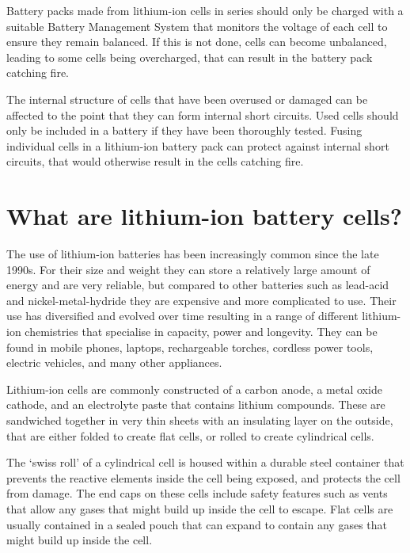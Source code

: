 \documentclass{article}
\theoremstyle{definition}
\theoremstyle{definition}
\theoremstyle{remark}
\begin{document}
    Battery packs made from lithium-ion cells in series should only be charged with a suitable Battery Management System that monitors the voltage of each cell to ensure they remain balanced. If this is not done, cells can become unbalanced, leading to some cells being overcharged, that can result in the battery pack catching fire. 

    The internal structure of cells that have been overused or damaged can be affected to the point that they can form internal short circuits. Used cells should only be included in a battery if they have been thoroughly tested. Fusing individual cells in a lithium-ion battery pack can protect against internal short circuits, that would otherwise result in the cells catching fire.



\section{What are lithium-ion battery cells?} %
\label{sec:what_are_lithium_ion_battery_cells}

  The use of lithium-ion batteries has been increasingly common since the late 1990s. For their size and weight they can store a relatively large amount of energy and are very reliable, but compared to other batteries such as lead-acid and nickel-metal-hydride they are expensive and more complicated to use. Their use has diversified and evolved over time resulting in a range of different lithium-ion chemistries that specialise in capacity, power and longevity. They can be found in mobile phones, laptops, rechargeable torches, cordless power tools, electric vehicles, and many other appliances. 

  Lithium-ion cells are commonly constructed of a carbon anode, a metal oxide cathode, and an electrolyte paste that contains lithium compounds. These are sandwiched together in very thin sheets with an insulating layer on the outside, that are either folded to create flat cells, or rolled to create cylindrical cells.

  The ‘swiss roll’ of a cylindrical cell is housed within a durable steel container that prevents the reactive elements inside the cell being exposed, and protects the cell from damage. The end caps on these cells include safety features such as vents that allow any gases that might build up inside the cell to escape. Flat cells are usually contained in a sealed pouch that can expand to contain any gases that might build up inside the cell. 
\end{document}
